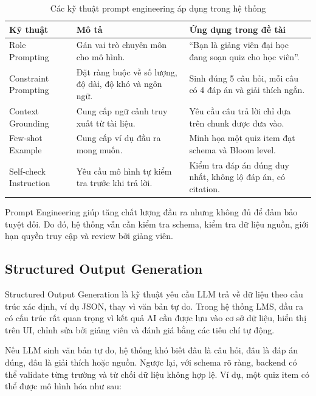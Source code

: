 \begin{table}[H]
    \centering
    \caption{Các kỹ thuật prompt engineering áp dụng trong hệ thống}
    \label{tab:prompt-engineering-techniques}
    \begin{tabular}{p{3.4cm}p{4.6cm}p{5.5cm}}
        \toprule
        \textbf{Kỹ thuật} & \textbf{Mô tả} & \textbf{Ứng dụng trong đề tài} \\
        \midrule
        Role Prompting & Gán vai trò chuyên môn cho mô hình. & ``Bạn là giảng viên đại học đang soạn quiz cho học viên''. \\
        Constraint Prompting & Đặt ràng buộc về số lượng, độ dài, độ khó và ngôn ngữ. & Sinh đúng 5 câu hỏi, mỗi câu có 4 đáp án và giải thích ngắn. \\
        Context Grounding & Cung cấp ngữ cảnh truy xuất từ tài liệu. & Yêu cầu câu trả lời chỉ dựa trên chunk được đưa vào. \\
        Few-shot Example & Cung cấp ví dụ đầu ra mong muốn. & Minh họa một quiz item đạt schema và Bloom level. \\
        Self-check Instruction & Yêu cầu mô hình tự kiểm tra trước khi trả lời. & Kiểm tra đáp án đúng duy nhất, không lộ đáp án, có citation. \\
        \bottomrule
    \end{tabular}
\end{table}

Prompt Engineering giúp tăng chất lượng đầu ra nhưng không đủ để đảm bảo tuyệt
đối. Do đó, hệ thống vẫn cần kiểm tra schema, kiểm tra dữ liệu nguồn, giới hạn
quyền truy cập và review bởi giảng viên.

\subsection{Structured Output Generation}
\label{subsec:structured-output-generation}

Structured Output Generation là kỹ thuật yêu cầu LLM trả về dữ liệu theo cấu
trúc xác định, ví dụ JSON, thay vì văn bản tự do. Trong hệ thống LMS, đầu ra có
cấu trúc rất quan trọng vì kết quả AI cần được lưu vào cơ sở dữ liệu, hiển thị
trên UI, chỉnh sửa bởi giảng viên và đánh giá bằng các tiêu chí tự động.

Nếu LLM sinh văn bản tự do, hệ thống khó biết đâu là câu hỏi, đâu là đáp án
đúng, đâu là giải thích hoặc nguồn. Ngược lại, với schema rõ ràng, backend có
thể validate từng trường và từ chối dữ liệu không hợp lệ. Ví dụ, một quiz item
có thể được mô hình hóa như sau:

